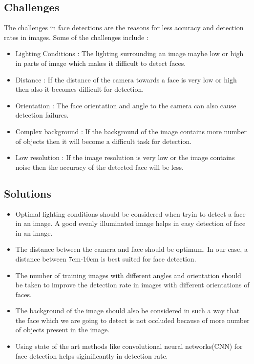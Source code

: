 \subsection{Challenges}
The challenges in face detections are the reasons for less accuracy and detection rates in images. Some of the challenges include :
\begin{itemize}
	\item Lighting Conditions : The lighting surrounding an image maybe low or high in parts of image which makes it difficult to detect faces.
	\item Distance : If the distance of the camera towards a face is very low or high then also it becomes difficult for detection.
	\item Orientation : The face orientation and angle to the camera can also cause detection failures.
	\item Complex background : If the background of the image contains more number of objects then it will become a difficult task for detection.
	\item Low resolution : If the image resolution is very low or the image contains noise then the accuracy of the detected face will be less.
\end{itemize}
\subsection{Solutions}
\begin{itemize}
	\item Optimal lighting conditions should be considered when tryin to detect a face in an image. A good evenly illuminated image helps in easy detection of face in an image.
	\item The distance between the camera and face should be optimum. In our case, a distance between 7cm-10cm is best suited for face detection.
	\item The number of training images with different angles and orientation should be taken to improve the detection rate in images with different orientations of faces.
	\item The background of the image should also be considered in such a way that the face which we are going to detect is not occluded because of more number of objects present in the image.
	\item Using state of the art methods like  convolutional neural networks(CNN) for face detection helps siginificantly in detection rate.
\end{itemize}
